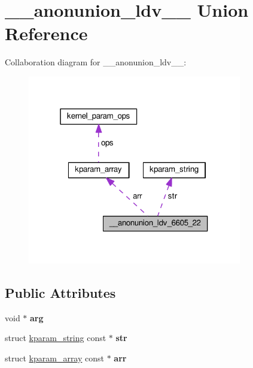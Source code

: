 \hypertarget{union____anonunion__ldv__6605__22}{}\section{\+\_\+\+\_\+anonunion\+\_\+ldv\+\_\+\_ Union Reference}
\label{union____anonunion__ldv__6605__22}


Collaboration diagram for \+\_\+\+\_\+anonunion\+\_\+ldv\+\_\+\_\+:
\nopagebreak
\begin{figure}[H]
\begin{center}
\leavevmode
\includegraphics[width=265pt]{union____anonunion__ldv__6605__22__coll__graph}
\end{center}
\end{figure}
\subsection*{Public Attributes}
\begin{DoxyCompactItemize}
\item 
\hypertarget{union____anonunion__ldv__6605__22_a87028ffbacae56c0a2fee83f9157c739}{}void $\ast$ {\bfseries arg}\label{union____anonunion__ldv__6605__22_a87028ffbacae56c0a2fee83f9157c739}

\item 
\hypertarget{union____anonunion__ldv__6605__22_a487d9a5cafab5b9a030afdb64e374dfd}{}struct \hyperlink{structkparam__string}{kparam\+\_\+string} const $\ast$ {\bfseries str}\label{union____anonunion__ldv__6605__22_a487d9a5cafab5b9a030afdb64e374dfd}

\item 
\hypertarget{union____anonunion__ldv__6605__22_ac4fee31dd1f836c125a5c82afd1d3c6f}{}struct \hyperlink{structkparam__array}{kparam\+\_\+array} const $\ast$ {\bfseries arr}\label{union____anonunion__ldv__6605__22_ac4fee31dd1f836c125a5c82afd1d3c6f}

\end{DoxyCompactItemize}


